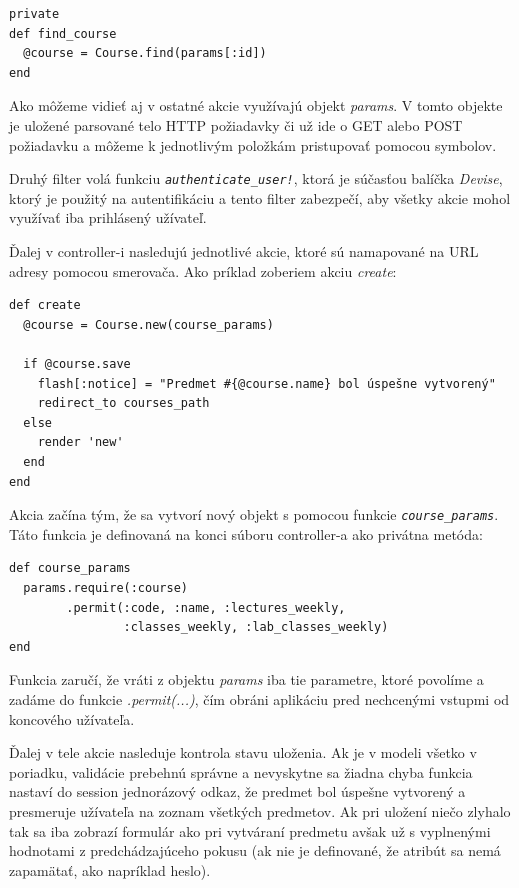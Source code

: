 \begin{verbatim}
private
def find_course
  @course = Course.find(params[:id])
end
\end{verbatim}

Ako môžeme vidieť aj v ostatné akcie využívajú objekt \emph{params}. V tomto objekte je uložené parsované telo HTTP požiadavky či už ide o GET alebo POST požiadavku a môžeme k jednotlivým položkám pristupovať pomocou symbolov.

Druhý filter volá funkciu \emph{\texttt{authenticate\_user!}}, ktorá je súčasťou balíčka \emph{Devise}, ktorý je použitý na autentifikáciu a tento filter zabezpečí, aby všetky akcie mohol využívať iba prihlásený užívateľ.

Ďalej v controller-i nasledujú jednotlivé akcie, ktoré sú namapované na URL adresy pomocou smerovača. Ako príklad zoberiem akciu \emph{create}:

\begin{verbatim}
def create
  @course = Course.new(course_params)

  if @course.save
    flash[:notice] = "Predmet #{@course.name} bol úspešne vytvorený"
    redirect_to courses_path
  else
    render 'new'
  end
end
\end{verbatim}

Akcia začína tým, že sa vytvorí nový objekt s pomocou funkcie \emph{\texttt{course\_params}}. Táto funkcia je definovaná na konci súboru controller-a ako privátna metóda:

\begin{verbatim}
def course_params
  params.require(:course)
        .permit(:code, :name, :lectures_weekly, 
                :classes_weekly, :lab_classes_weekly)
end
\end{verbatim}

Funkcia zaručí, že vráti z objektu \emph{params} iba tie parametre, ktoré povolíme a zadáme do funkcie \emph{.permit(...)}, čím obráni aplikáciu pred nechcenými vstupmi od koncového užívateľa.

Ďalej v tele akcie nasleduje kontrola stavu uloženia. Ak je v modeli všetko v poriadku, validácie prebehnú správne a nevyskytne sa žiadna chyba funkcia nastaví do session jednorázový odkaz, že predmet bol úspešne vytvorený a presmeruje užívateľa na zoznam všetkých predmetov. Ak pri uložení niečo zlyhalo tak sa iba zobrazí formulár ako pri vytváraní predmetu avšak už s vyplnenými hodnotami z predchádzajúceho pokusu (ak nie je definované, že atribút sa nemá zapamätať, ako napríklad heslo).

